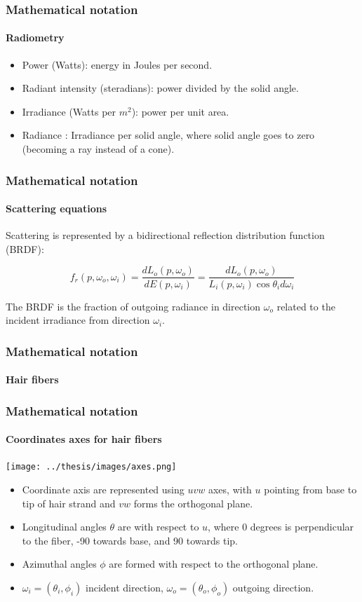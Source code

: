 \documentclass{beamer}
\begin{document}
  
  \begin{frame}
    \frametitle{Mathematical notation}
	\framesubtitle{Radiometry}
	\begin{itemize}
	\item Power (Watts): energy in Joules per second.
	\item Radiant intensity (steradians): power divided by the solid angle.
	\item Irradiance (Watts per $m^2$): power per unit area.
	\item Radiance : Irradiance per solid angle, where solid angle goes to zero (becoming a ray instead of a cone).
	\end{itemize}
  \end{frame}
  
  \begin{frame}
    \frametitle{Mathematical notation}
	\framesubtitle{Scattering equations}
	
	Scattering is represented by a bidirectional reflection distribution function (BRDF):
	
	\begin{equation}
	f_r(p, \omega_o, \omega_i) = \frac{dL_o(p, \omega_o)}{dE(p, \omega_i)} = \frac{dL_o(p, \omega_o)}{L_i(p, \omega_i) \cos \theta_i d\omega_i}
	\end{equation}
	
	The BRDF is the fraction of outgoing radiance in direction $\omega_o$ related to the incident irradiance from direction $\omega_i$.

  \end{frame}
  
  \begin{frame}
    \frametitle{Mathematical notation}
	\framesubtitle{Hair fibers}
	
	
	
  \end{frame}
  
  \begin{frame}
    \frametitle{Mathematical notation}
	\framesubtitle{Coordinates axes for hair fibers}

\texttt{[image: ../thesis/images/axes.png]}

\begin{itemize}
\item Coordinate axis are represented using $uvw$ axes, with $u$ pointing from base to tip of hair strand and $vw$ forms the orthogonal plane.
	
\item Longitudinal angles $\theta$ are with respect to $u$, where 0 degrees is perpendicular to the fiber, -90 towards base, and 90 towards tip.
	
\item Azimuthal angles $\phi$ are formed with respect to the orthogonal plane.
	
	\item $\omega_i = (\theta_i, \phi_i)$ incident direction, $\omega_o = (\theta_o, \phi_o)$ outgoing direction.
\end{itemize}	
	
	\end{frame}
  
\end{document}
